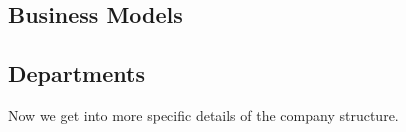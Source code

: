 \documentclass{article}
\begin{document}
    \begin{definition}[Energy]
      
    \end{definition}

  \subsection{Business Models}

    \begin{definition}[Retailer]
      
    \end{definition}

    \begin{definition}[Wholesaler]
      
    \end{definition}

    \begin{definition}[Subscription]
      
    \end{definition}

    \begin{example}[Apple]
    
    \end{example}

    \begin{example}[Costco]
      
    \end{example}

  \subsection{Departments}

    Now we get into more specific details of the company structure. 

    \begin{definition}
      
    \end{definition}

    \begin{definition}
      
    \end{definition}

    \begin{definition}
      
    \end{definition}

    \begin{definition}
      
    \end{definition}
\end{document}
